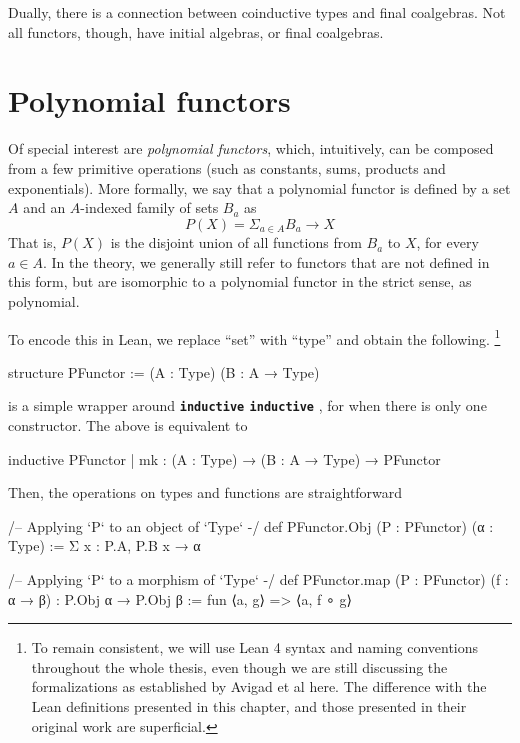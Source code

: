 \documentclass[titlepage]{report}
\newenvironment{remark}{%
\begin{framed}
\begin{trivlist}
    \item[\hskip \labelsep {\bfseries Remark:}]}%
{%
\end{trivlist}%
\end{framed}
}
\newcommand\lean[1]{%
\ifx\leanmode\undefined%
\def\leanmode{1}%
\texttt{\small #1}%
\undef\leanmode%
\else%
\texttt{#1}%
\fi%
}
\newcommand\keyword[1]{{\color{keywordcolor} \textbf{\lean{#1}}}}
\newcommand\inductive{{\keyword{inductive}}}
\begin{document}
Dually, there is a connection between coinductive types and final coalgebras.
Not all functors, though, have initial algebras, or final coalgebras.


\section{Polynomial functors}
Of special interest are \emph{polynomial functors}, which, intuitively, can be composed from a few primitive operations (such as constants, sums, products and exponentials).
More formally, we say that a polynomial functor is defined by a set $A$ and an $A$-indexed family of sets $B_a$ as
\[
    P(X) = \Sigma_{a ∈ A} B_a \rightarrow X  
\]
That is, $P(X)$ is the disjoint union of all functions from $B_a$ to $X$, for every $a ∈ A$.
In the theory, we generally still refer to functors that are not defined in this form, but are isomorphic to a polynomial functor in the strict sense, as polynomial.

To encode this in Lean, we replace ``set'' with ``type'' and obtain the following.
\footnote{To remain consistent, we will use Lean 4 syntax and naming conventions throughout the whole thesis, even though we are still discussing the formalizations as established by Avigad et al here. The difference with the Lean definitions presented in this chapter, and those presented in their original work are superficial.}
\begin{leancode}
    structure PFunctor := (A : Type) (B : A → Type)
\end{leancode}

\begin{remark}
     is a simple wrapper around \inductive, for when there is only one constructor.
    The above is equivalent to
    \begin{leancode}
        inductive PFunctor 
        | mk : (A : Type) → (B : A → Type) → PFunctor
    \end{leancode}
\end{remark}

Then, the operations on types and functions are straightforward
\begin{leancode}
    /-- Applying `P` to an object of `Type` -/
    def PFunctor.Obj (P : PFunctor) (α : Type)
        := Σ x : P.A, P.B x → α

    /-- Applying `P` to a morphism of `Type` -/
    def PFunctor.map (P : PFunctor) (f : α → β) : P.Obj α → P.Obj β 
        := fun ⟨a, g⟩ => ⟨a, f ∘ g⟩
\end{leancode}
\end{document}
